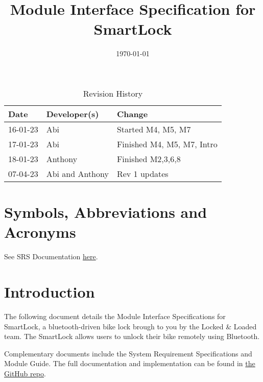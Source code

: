 \documentclass[12pt, titlepage]{article}
\title{Module Interface Specification for SmartLock \progname{}}
\author{\authname}
\date{\today}
\begin{document}
\maketitle
\thispagestyle{empty}

\newpage
{}
\begin{table}[hp]
\caption{Revision History} \label{TblRevisionHistory}
\begin{tabularx}{\textwidth}{llX}
\toprule
\textbf{Date} & \textbf{Developer(s)} & \textbf{Change}\\
\midrule
16-01-23 & Abi & Started M4, M5, M7\\
17-01-23  & Abi & Finished M4, M5, M7, Intro\\
18-01-23 & Anthony & Finished M2,3,6,8\\
07-04-23 & Abi and Anthony & Rev 1 updates\\
\bottomrule
\end{tabularx}
\end{table}


\newpage
\tableofcontents
\listoftables

\newpage
{}

\section{Symbols, Abbreviations and Acronyms}

See SRS Documentation \href{https://github.com/NevoAbigail/Capstone/blob/main/docs/SRS/SRS.pdf}{here}.


\section{Introduction}

The following document details the Module Interface Specifications for
SmartLock, a bluetooth-driven bike lock brough to you by the Locked \& Loaded team. The SmartLock allows users to unlock their bike remotely using Bluetooth. 


Complementary documents include the System Requirement Specifications
and Module Guide.  The full documentation and implementation can be
found in \href{https://github.com/NevoAbigail/Capstone}{the GitHub repo}. %
\end{document}
